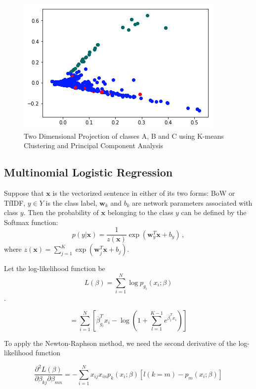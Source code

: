 \begin{figure}[t]
    \centering
    \includegraphics[width=.75\linewidth]{../Figures/pca_proj.png} 
    \caption{Two Dimensional Projection of classes A, B and C using K-means Clustering and Principal Component Analysis}
    \label{fig:kmeans_pca}
\end{figure}

\subsection{Multinomial Logistic Regression}
Suppose that $\mathbf{x}$ is the vectorized sentence in either of its two forms: BoW or TfIDF, $y\in Y$ is the class label, $\mathbf{w}_k$ and $b_k$ are network parameters associated with class $y$. Then the probability of $\mathbf{x}$ belonging to the class $y$ can be defined by the Softmax function:
\begin{equation}
p(y|\mathbf{x}) =\frac{1}{z(\mathbf{x})}\exp(\mathbf{w}_y^T\mathbf{x}+b_y) \,,
\label{eq:softmax}
\end{equation}
where $z(\mathbf{x}) = \sum_{j=1}^{K}\exp(\mathbf{w}_j^T\mathbf{x}+b_j)$.

Let the log-likelihood function be $$L ( \beta ) = \sum _ { i = 1 } ^ { N } \log p _ { g _ { i } } \left( x _ { i } ; \beta \right)$$. 

$$= \sum _ { i = 1 } ^ { N } \left[ \overline { \beta } _ { g _ { i } } ^ { T } x _ { i } - \log \left( 1 + \sum _ { l = 1 } ^ { K - 1 } e ^ { \overline { \beta } _ { l } ^ { T } x _ { i } } \right) \right]$$

To apply the Newton-Raphson method, we need the second derivative of the log-likelihood function

$$\frac { \partial ^ { 2 } L ( \beta ) } { \partial \beta _ { k j } \partial \beta _ { m n } } = - \sum _ { i = 1 } ^ { N } x _ { i j } x _ { i n } p _ { k } \left( x _ { i } ; \beta \right) \left[ l ( k = m ) - p _ { m } \left( x _ { i } ; \beta \right) \right]$$


